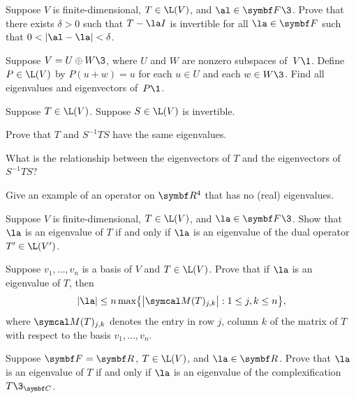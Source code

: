 \begin{exercises}
\exercise
Suppose $V$ is finite-dimensional, $T \in \L(V)$, and $\al \in \F{}\3$. Prove that there exists $\delta > 0$ such that
$T - \la I$ is invertible for all $\la \in \F{}$ such that \mbox{$0 < |\al - \la| < \delta$}.


\exercise
Suppose $V = U \oplus W\3$,  where $U$ and $W$ are nonzero subspaces of~$V\1$. Define $P \in \L(V)$ by $P(u + w) = u$ for each $u \in U$ and each $w \in W\3$. Find all eigenvalues and eigenvectors of~$P\1$.


\exercise
Suppose $T \in \L(V)$. Suppose $S \in \L(V)$ is invertible.
\begin{subtheorem}
\item
Prove that $T$ and $S^{-1} T S$ have the same eigenvalues.
\item
What is the relationship between the eigenvectors of $T$ and the eigenvectors of $S^{-1} T S$?
\end{subtheorem}
\exercisesubtheoremend


\exercise
Give an example of an operator on $\R{4}$ that has no (real) eigenvalues.


\exercise
Suppose $V$ is finite-dimensional, $T \in \L(V)$, and $\la \in \F{}\3$. Show that $\la$ is an eigenvalue of $T$ if and only if $\la$ is an eigenvalue of the dual operator $T' \in \L(V')$.\label{5eigdual}


\exercise
Suppose $v_1, \ldots, v_n$ is a basis of $V$ and $T \in \L(V)$. Prove that if $\la$ is an eigenvalue of $T$, then
\[
\abs{\la} \le n \max \br[\big]{ \abs[\big]{\M(T)_{j,k}} : 1 \le j, k \le n },
\]
where $\M(T)_{j,k}$ denotes the entry in row $j$, column $k$ of the matrix of $T$ with respect to the basis $v_1, \ldots, v_n$.

\exercise
Suppose $\F{} = \R{}$, $T \in \L(V)$, and $\la \in \R{}$. Prove that $\la$ is an eigenvalue of $T$ if and only if $\la$ is an eigenvalue of the complexification $T\3_{\C{}}$.\label{5realeig}



\end{exercises}
